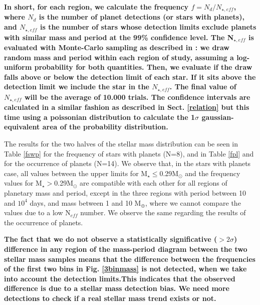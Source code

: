 \documentclass[structabstract]{aa}
\begin{document}
\textbf{In short, for each region, we calculate the frequency $f=N_{d}/N_{\star,eff}$, where $N_{d}$ is the number of planet detections (or stars with planets), and $N_{\star,eff}$ is the number of stars whose detection limits exclude planets with similar mass and period at the 99\% confidence level. The N$_{\star,eff}$ is evaluated with Monte-Carlo sampling as described in \citet{Bonfils-2011}: we draw random mass and period within each region of study, assuming a log-uniform probability for both quantities. Then, we evaluate if the draw falls above or below the detection limit of each star. If it sits above the detection limit we include the star in the $N_{\star,eff}$. The final value of $N_{\star,eff}$ will be the average of 10.000 trials. The confidence intervals are calculated in a similar fashion as described in Sect. \ref{relation} but this time using a poissonian distribution to calculate the 1$\sigma$ gaussian-equivalent area of the probability distribution.}%

The results for the two halves of the stellar mass distribution can be seen in Table \ref{fswp} for the frequency of stars with planets (N=8), and in Table \ref{fpl} and for the occurrence of planets (N=14). We observe that, in the stars with planets case, all values between the upper limits for M$_{\star} \le $0.29M$_{\odot}$ and the frequency values  for M$_{\star} > $0.29M$_{\odot}$ are compatible with each other for all regions of planetary mass and period, except in the three regions with period between 10 and $10^{4}$ days, and mass between 1 and 10 M$_{\oplus}$, where we cannot compare the values due to a low N$_{eff}$ number. We observe the same regarding the results of the occurrence of planets. 

\textbf{The fact that we do not observe a statistically significative ($> 2\sigma$) difference in any region of the mass-period diagram between the two stellar mass samples means that the difference between the frequencies of the first two bins in Fig. \ref{3binmass} is not detected, when we take into account the detection limits.This indicates that the observed difference is due to a stellar mass detection bias. We need more detections to check if a real stellar mass trend exists or not.}

\end{document}
